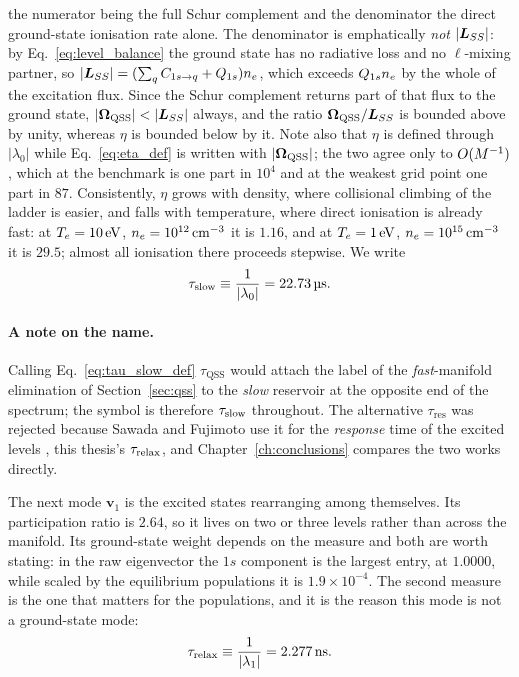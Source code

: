 \noindent the numerator being the full Schur complement and the denominator the
direct ground-state ionisation rate alone. The denominator is emphatically
\emph{not} $|\bm{L}_{SS}|$: by Eq.~\eqref{eq:level_balance} the ground state has
no radiative loss and no $\ell$-mixing partner, so
$|\bm{L}_{SS}| = (\sum_q C_{1s \to q} + Q_{1s})n_e$, which exceeds $Q_{1s}n_e$
by the whole of the excitation flux. Since the Schur complement returns part of
that flux to the ground state, $|\bm{\Omega}_{\mathrm{QSS}}| < |\bm{L}_{SS}|$ always, and the ratio
$\bm{\Omega}_{\mathrm{QSS}}/\bm{L}_{SS}$ is bounded above by unity, whereas $\eta$ is bounded
below by it. Note also that $\eta$ is defined through $|\lambda_0|$ while
Eq.~\eqref{eq:eta_def} is written with $|\bm{\Omega}_{\mathrm{QSS}}|$; the two agree only to
$O(M^{-1})$, which at the benchmark is one part in $10^{4}$ and at the
weakest grid point one part in $87$. Consistently,
$\eta$ grows with density, where collisional climbing of the ladder is easier,
and falls with temperature, where direct ionisation is already fast: at
$T_e = \SI{10}{\electronvolt}$, $n_e = \SI{e12}{\per\cubic\centi\metre}$ it is
$1.16$, and at $T_e = \SI{1}{\electronvolt}$,
$n_e = \SI{e15}{\per\cubic\centi\metre}$ it is $29.5$; almost all ionisation
there proceeds stepwise. We write
\begin{equation}
  \tau_{\mathrm{slow}} \equiv \frac{1}{|\lambda_0|} = \SI{22.73}{\micro\second}.
  \label{eq:tau_slow_def}
\end{equation}

\paragraph{A note on the name.} Calling Eq.~\eqref{eq:tau_slow_def}
$\tau_{\mathrm{QSS}}$ would attach the label of the \emph{fast}-manifold
elimination of Section~\ref{sec:qss} to the \emph{slow} reservoir at the
opposite end of the spectrum; the symbol is therefore $\tau_{\mathrm{slow}}$ throughout. The alternative $\tau_{\mathrm{res}}$ was
rejected because Sawada and Fujimoto use it for the \emph{response} time of the
excited levels \cite{SawadaFujimoto1994}, this thesis's $\tau_{\mathrm{relax}}$, and
Chapter~\ref{ch:conclusions} compares the two works directly.

The next mode $\bm{v}_1$ is the excited states rearranging among themselves.
Its participation ratio is $2.64$, so it lives on two or three levels rather
than across the manifold. Its ground-state weight depends on the measure and
both are worth stating: in the raw eigenvector the $1s$ component is the largest
entry, at $1.0000$, while scaled by the equilibrium populations it is
$1.9\times10^{-4}$. The second measure is the one that matters for the
populations, and it is the reason this mode is not a ground-state mode:
\begin{equation}
  \tau_{\mathrm{relax}} \equiv \frac{1}{|\lambda_1|} = \SI{2.277}{\nano\second}.
\end{equation}

